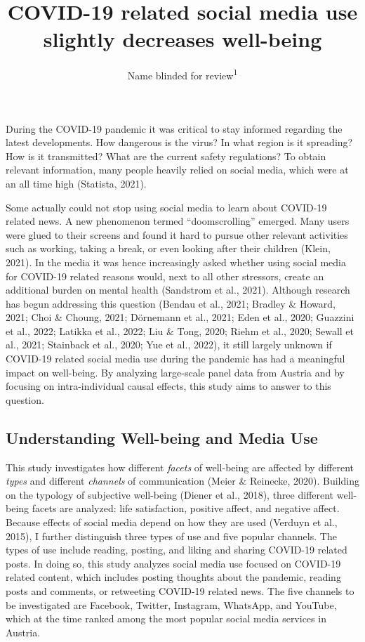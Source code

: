 \documentclass[
  man,mask,floatsintext]{apa7}
\title{COVID-19 related social media use slightly decreases well-being}
\author{Name blinded for review\textsuperscript{1}}
\date{}
\affiliation{\vspace{0.5cm}\textsuperscript{1} }
\begin{document}
\maketitle

During the COVID-19 pandemic it was critical to stay informed regarding the latest developments.
How dangerous is the virus?
In what region is it spreading?
How is it transmitted? What are the current safety regulations?
To obtain relevant information, many people heavily relied on social media, which were at an all time high (Statista, 2021).

Some actually could not stop using social media to learn about COVID-19 related news.
A new phenomenon termed ``doomscrolling'' emerged.
Many users were glued to their screens and found it hard to pursue other relevant activities such as working, taking a break, or even looking after their children (Klein, 2021).
In the media it was hence increasingly asked whether using social media for COVID-19 related reasons would, next to all other stressors, create an additional burden on mental health (Sandstrom et al., 2021).
Although research has begun addressing this question (Bendau et al., 2021; Bradley \& Howard, 2021; Choi \& Choung, 2021; Dörnemann et al., 2021; Eden et al., 2020; Guazzini et al., 2022; Latikka et al., 2022; Liu \& Tong, 2020; Riehm et al., 2020; Sewall et al., 2021; Stainback et al., 2020; Yue et al., 2022), it still largely unknown if COVID-19 related social media use during the pandemic has had a meaningful impact on well-being.
By analyzing large-scale panel data from Austria and by focusing on intra-individual causal effects, this study aims to answer to this question.

\hypertarget{understanding-well-being-and-media-use}{%
\subsection{Understanding Well-being and Media Use}\label{understanding-well-being-and-media-use}}

This study investigates how different \emph{facets} of well-being are affected by different \emph{types} and different \emph{channels} of communication (Meier \& Reinecke, 2020).
Building on the typology of subjective well-being (Diener et al., 2018), three different well-being facets are analyzed: life satisfaction, positive affect, and negative affect.
Because effects of social media depend on how they are used (Verduyn et al., 2015), I further distinguish three types of use and five popular channels.
The types of use include reading, posting, and liking and sharing COVID-19 related posts.
In doing so, this study analyzes social media use focused on COVID-19 related content, which includes posting thoughts about the pandemic, reading posts and comments, or retweeting COVID-19 related news.
The five channels to be investigated are Facebook, Twitter, Instagram, WhatsApp, and YouTube, which at the time ranked among the most popular social media services in Austria.
\end{document}
